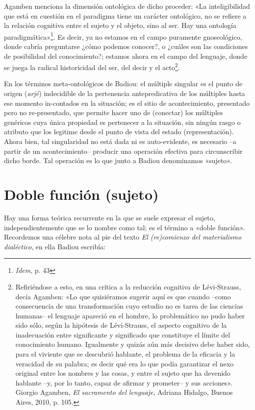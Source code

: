 Agamben menciona la dimensión ontológica de dicho proceder: «La inteligibilidad que está en cuestión en el paradigma tiene un carácter ontológico, no se refiere a la relación cognitiva entre el sujeto y el objeto, sino al ser. Hay una ontología paradigmática»\footnote{\emph{Idem}, p. 43}. Es decir, ya no estamos en el campo puramente gnoseológico, donde cabría preguntarse ¿cómo podemos conocer?, o ¿cuáles son las condiciones de posibilidad del conocimiento?; estamos ahora en el campo del lenguaje, donde se juega la radical historicidad del ser, del decir y el acto\footnote{Refiriéndose a esto, en una crítica a la reducción cognitiva de Lévi-Strauss, decía Agamben: «Lo que quisiéramos sugerir aquí es que cuando --como consecuencia de una transformación cuyo estudio no es tarea de las ciencias humanas-- el lenguaje apareció en el hombre, lo problemático no pudo haber sido sólo, según la hipótesis de Lévi-Strauss, el aspecto cognitivo de la inadecuación entre significante y significado que constituye el límite del conocimiento humano. Igualmente y quizás aún más decisivo debe haber sido, para el viviente que se descubrió hablante, el problema de la eficacia y la veracidad de su palabra; es decir qué era lo que podía garantizar el nexo original entre los nombres y las cosas, y entre el sujeto que ha devenido hablante --y, por lo tanto, capaz de afirmar y prometer-- y sus acciones». Giorgio Agamben, \emph{El sacramento del lenguaje}, Adriana Hidalgo, Buenos Aires, 2010, p. 105.}.

En los términos meta-ontológicos de Badiou: el múltiple singular es el punto de origen (\emph{arjé}) indecidible de la pertenencia antepredicativa de los múltiples hasta ese momento in-contados en la situación; es el sitio de acontecimiento, presentado pero no re-presentado, que permite hacer uno de (conectar) los múltiples genéricos cuya única propiedad es pertenecer a la situación, sin ningún rasgo o atributo que los legitime desde el punto de vista del estado (representación). Ahora bien, tal singularidad no está dada ni es auto-evidente, es necesario --a partir de un acontecimiento-- producir una operación efectiva para circunscribir dicho borde. Tal operación es lo que junto a Badiou denominamos «sujeto».

\section{Doble función (sujeto)}

Hay una forma teórica recurrente en la que se suele expresar el sujeto, independientemente que se lo nombre como tal; es el término a «doble función». Recordemos una célebre nota al pie del texto \emph{El (re)comienzo del materialismo dialéctico}, en ella Badiou escribía:

